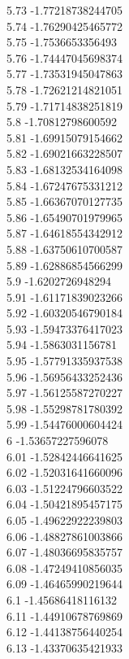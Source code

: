 {5.73	-1.77218738244705\\
5.74	-1.76290425465772\\
5.75	-1.7536653356493\\
5.76	-1.74447045698374\\
5.77	-1.73531945047863\\
5.78	-1.72621214821051\\
5.79	-1.71714838251819\\
5.8	-1.70812798600592\\
5.81	-1.69915079154662\\
5.82	-1.69021663228507\\
5.83	-1.68132534164098\\
5.84	-1.67247675331212\\
5.85	-1.66367070127735\\
5.86	-1.65490701979965\\
5.87	-1.64618554342912\\
5.88	-1.63750610700587\\
5.89	-1.62886854566299\\
5.9	-1.6202726948294\\
5.91	-1.61171839023266\\
5.92	-1.60320546790184\\
5.93	-1.59473376417023\\
5.94	-1.5863031156781\\
5.95	-1.57791335937538\\
5.96	-1.56956433252436\\
5.97	-1.56125587270227\\
5.98	-1.55298781780392\\
5.99	-1.54476000604424\\
6	-1.53657227596078\\
6.01	-1.52842446641625\\
6.02	-1.52031641660096\\
6.03	-1.51224796603522\\
6.04	-1.50421895457175\\
6.05	-1.49622922239803\\
6.06	-1.48827861003866\\
6.07	-1.48036695835757\\
6.08	-1.47249410856035\\
6.09	-1.46465990219644\\
6.1	-1.45686418116132\\
6.11	-1.44910678769869\\
6.12	-1.44138756440254\\
6.13	-1.43370635421933\\
}
